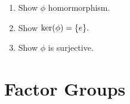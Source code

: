 \begin{note}
    \leavevmode
    \begin{enumerate}[label=(Step \arabic*), leftmargin=*]
        \item Show $\phi$ homormorphism.
        \item Show $\operatorname{ker}(\phi) = \{e\}.$
        \item Show $\phi$ is surjective.
    \end{enumerate}
\end{note}

\section{Factor Groups}

